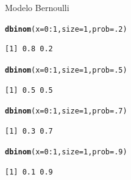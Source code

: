 \documentclass[10pt]{beamer}\usepackage[]{graphicx}\usepackage[]{color}
\makeatletter
\newcommand{\hlnum}[1]{\textcolor[rgb]{0.686,0.059,0.569}{#1}}%
\newcommand{\hlopt}[1]{\textcolor[rgb]{0,0,0}{#1}}%
\newcommand{\hlstd}[1]{\textcolor[rgb]{0.345,0.345,0.345}{#1}}%
\newcommand{\hlkwc}[1]{\textcolor[rgb]{0.333,0.667,0.333}{#1}}%
\newcommand{\hlkwd}[1]{\textcolor[rgb]{0.737,0.353,0.396}{\textbf{#1}}}%
\newenvironment{kframe}{%
 \def\at@end@of@kframe{}%
 \ifinner\ifhmode%
  \def\at@end@of@kframe{\end{minipage}}%
  \begin{minipage}{\columnwidth}%
 \fi\fi%
 \def\FrameCommand##1{\hskip\@totalleftmargin \hskip-\fboxsep
 \colorbox{shadecolor}{##1}\hskip-\fboxsep
     \hskip-\linewidth \hskip-\@totalleftmargin \hskip\columnwidth}%
 \MakeFramed {\advance\hsize-\width
   \@totalleftmargin\z@ \linewidth\hsize
   \@setminipage}}%
 {\par\unskip\endMakeFramed%
 \at@end@of@kframe}
\newenvironment{knitrout}{}{} %
\theoremstyle{definition}
\makeatother
\begin{document}
\begin{frame}[fragile]{Modelo Bernoulli}
\begin{knitrout}\small
{}\color{fgcolor}\begin{kframe}
\begin{alltt}
\hlkwd{dbinom}\hlstd{(}\hlkwc{x} \hlstd{=} \hlnum{0}\hlopt{:}\hlnum{1}\hlstd{,} \hlkwc{size} \hlstd{=} \hlnum{1}\hlstd{,} \hlkwc{prob} \hlstd{=} \hlnum{.2}\hlstd{)}
\end{alltt}
\begin{verbatim}
[1] 0.8 0.2
\end{verbatim}
\begin{alltt}
\hlkwd{dbinom}\hlstd{(}\hlkwc{x} \hlstd{=} \hlnum{0}\hlopt{:}\hlnum{1}\hlstd{,} \hlkwc{size} \hlstd{=} \hlnum{1}\hlstd{,} \hlkwc{prob} \hlstd{=} \hlnum{.5}\hlstd{)}
\end{alltt}
\begin{verbatim}
[1] 0.5 0.5
\end{verbatim}
\begin{alltt}
\hlkwd{dbinom}\hlstd{(}\hlkwc{x} \hlstd{=} \hlnum{0}\hlopt{:}\hlnum{1}\hlstd{,} \hlkwc{size} \hlstd{=} \hlnum{1}\hlstd{,} \hlkwc{prob} \hlstd{=} \hlnum{.7}\hlstd{)}
\end{alltt}
\begin{verbatim}
[1] 0.3 0.7
\end{verbatim}
\begin{alltt}
\hlkwd{dbinom}\hlstd{(}\hlkwc{x} \hlstd{=} \hlnum{0}\hlopt{:}\hlnum{1}\hlstd{,} \hlkwc{size} \hlstd{=} \hlnum{1}\hlstd{,} \hlkwc{prob} \hlstd{=} \hlnum{.9}\hlstd{)}
\end{alltt}
\begin{verbatim}
[1] 0.1 0.9
\end{verbatim}
\end{kframe}
\end{knitrout}
\end{frame}
\end{document}
